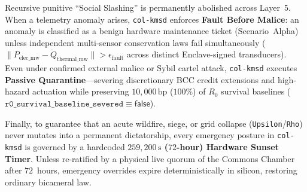 \begin{invariant}
\label{inv:ch7-passive-quarantine}
Recursive punitive ``Social Slashing'' is permanently abolished across Layer~5. When a telemetry
anomaly arises, \texttt{col-kmsd} enforces \textbf{Fault Before Malice}: an anomaly is classified
as a benign hardware maintenance ticket (Scenario~Alpha) unless independent multi-sensor conservation
laws fail simultaneously ($\|P_{\mathrm{elec\_mw}} - \dot{Q}_{\mathrm{thermal\_mw}}\| > \epsilon_{\mathrm{fault}}$
across distinct Enclave-signed transducers). Even under confirmed external malice or Sybil cartel
attack, \texttt{col-kmsd} executes \textbf{Passive Quarantine}---severing discretionary BCC credit
extensions and high-hazard actuation while preserving $10{,}000\,\mathrm{bp}$ ($100\%$) of $R_0$
survival baselines ($\mathtt{r0\_survival\_baseline\_severed} \equiv \mathsf{false}$).
\end{invariant}

Finally, to guarantee that an acute wildfire, siege, or grid collapse (\texttt{Upsilon}/\texttt{Rho})
never mutates into a permanent dictatorship, every emergency posture in \texttt{col-kmsd} is
governed by a hardcoded \textbf{$259{,}200\,\mathrm{s}$ ($72$-hour) Hardware Sunset Timer}. Unless
re-ratified by a physical live quorum of the Commons Chamber after $72$~hours, emergency overrides
expire deterministically in silicon, restoring ordinary bicameral law.

